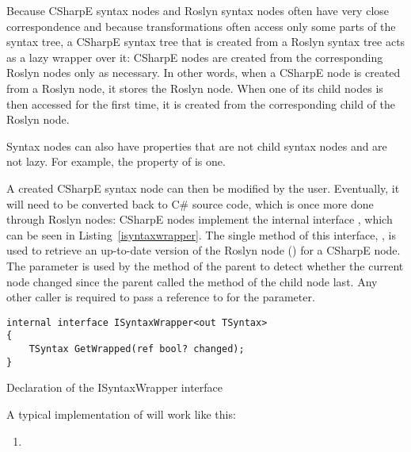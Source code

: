 \medskip

Because CSharpE syntax nodes and Roslyn syntax nodes often have very close correspondence and because transformations often access only some parts of the syntax tree, a CSharpE syntax tree that is created from a Roslyn syntax tree acts as a lazy wrapper over it: CSharpE nodes are created from the corresponding Roslyn nodes only as necessary. In other words, when a CSharpE node is created from a Roslyn node, it stores the Roslyn node. When one of its child nodes is then accessed for the first time, it is created from the corresponding child of the Roslyn node.


Syntax nodes can also have properties that are not child syntax nodes and are not lazy. For example, the property  of  is one.

\medskip

A created CSharpE syntax node can then be modified by the user. Eventually, it will need to be converted back to C\# source code, which is once more done through Roslyn nodes: CSharpE nodes implement the internal interface , which can be seen in Listing~\ref{isyntaxwrapper}. The single method of this interface, , is used to retrieve an up-to-date version of the Roslyn node () for a CSharpE node. The  parameter is used by the  method of the parent to detect whether the current node changed since the parent called the  method of the child node last. Any other caller is required to pass a reference to  for the parameter.

\begin{listing}
\begin{verbatim}
internal interface ISyntaxWrapper<out TSyntax>
{
    TSyntax GetWrapped(ref bool? changed);
}
\end{verbatim}
\caption{Declaration of the ISyntaxWrapper interface}
\label{isyntaxwrapper}
\end{listing}


A typical implementation of  will work like this:

\begin{enumerate}
\item 
\end{enumerate}

